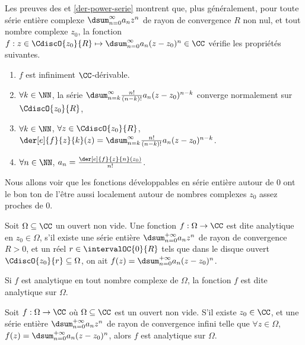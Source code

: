 \begin{remark}
	Les preuves des  et \ref{der-power-serie} montrent que, plus généralement,
	pour toute série entière complexe $\dsum_{n=0}^{\infty} a_n z^n$ de rayon de convergence $R$ non nul,
	et tout nombre complexe $z_0$,
	la fonction $f: z \in \CdiscO{z_0}{R} \mapsto \dsum_{n=0}^{\infty} a_n (z - z_0)^n \in \CC$ vérifie les propriétés suivantes.
    \begin{enumerate}
    	\item $f$ est infiniment $\CC$-dérivable.

    	\item $\forall k \in \NN$,
		la série $\dsum_{n = k}^{\infty} \frac{n!}{(n-k)!} a_n (z - z_0)^{n - k}$ converge normalement sur $\CdiscO{z_0}{R}$,

    	\item $\forall k \in \NN$, $\forall z \in \CdiscO{z_0}{R}$,
		$\der[e]{f}{z}{k}(z) = \dsum_{n = k}^{\infty} \frac{n!}{(n-k)!} a_n (z - z_0)^{n - k}$.

    	\item $\forall n \in \NN$, $a_n = \frac{\der[e]{f}{z}{n}(z_0)}{n!}$.
    \end{enumerate}
\end{remark}




Nous allons voir que les fonctions développables en série entière autour de $0$ ont le bon ton de l'être aussi localement autour de nombres complexes $z_0$ assez proches de $0$.


\begin{defi}
    Soit $\Omega \subseteq \CC$ un ouvert non vide.
	Une fonction $f: \Omega \rightarrow \CC$ est dite analytique en $z_0 \in \Omega$, 
	s'il existe
	une série entière $\dsum_{n = 0}^{+\infty} a_n z^n$
	de rayon de convergence $R > 0$,
	et
	un réel $r \in \intervalOC{0}{R}$ tels que dans le disque ouvert $\CdiscO{z_0}{r} \subseteq \Omega$, on ait
	$f(z) = \dsum_{n = 0}^{+\infty} a_n (z - z_0)^n$.

	\smallskip
	
	Si $f$ est analytique en tout nombre complexe de $\Omega$,
	la fonction $f$ est dite analytique sur $\Omega$.
\end{defi}




\begin{fact} \label{power-series-vs-analytic}
    Soit $f: \Omega \rightarrow \CC$ où $\Omega \subseteq \CC$ est un ouvert non vide.
    S'il existe
    $z_0 \in \CC$,
    et
    une série entière $\dsum_{n = 0}^{+\infty} a_n z^n$ de rayon de convergence infini
    telle que
	$\forall z \in \Omega$, $f(z) = \dsum_{n = 0}^{+\infty} a_n (z - z_0)^n$,
	alors
	$f$ est analytique sur $\Omega$. 
\end{fact}


